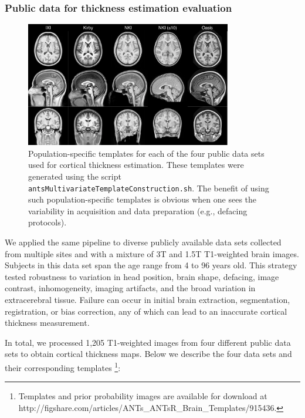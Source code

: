 \subsubsection{Public data for thickness estimation evaluation}

\begin{figure}
  \centering
  \includegraphics[width=90mm]{Figures/templates.pdf}
  \caption{Population-specific templates for each of the four public data sets used
  for cortical thickness 
  estimation. These templates were generated using the script {\tt antsMultivariateTemplateConstruction.sh}.
  The benefit of using such population-specific templates is obvious when one sees the variability in
  acquisition and data preparation (e.g., defacing protocols).
  }
  \label{fig:template}
\end{figure}

We applied the same pipeline to diverse publicly available data sets collected
from multiple sites and with a mixture of 3T and
1.5T T1-weighted brain images.  Subjects in this data set  
span the age range from 4 to 96 years old.  This strategy tested robustness to
variation in head position, brain shape, defacing, image contrast, inhomogeneity, imaging
artifacts, and the broad variation in extracerebral tissue.  Failure
can occur in initial brain extraction, segmentation, registration, or
bias correction, any of which can lead to an inaccurate cortical
thickness measurement.                           

In total, we processed 1,205 T1-weighted images from four different
public data sets to obtain cortical thickness maps.
Below we describe the four data sets and their corresponding
templates%
\footnote
{
Templates and prior probability images are available for download at
http://figshare.com/articles/ANTs\_ANTsR\_Brain\_Templates/915436.
}:
                                          
